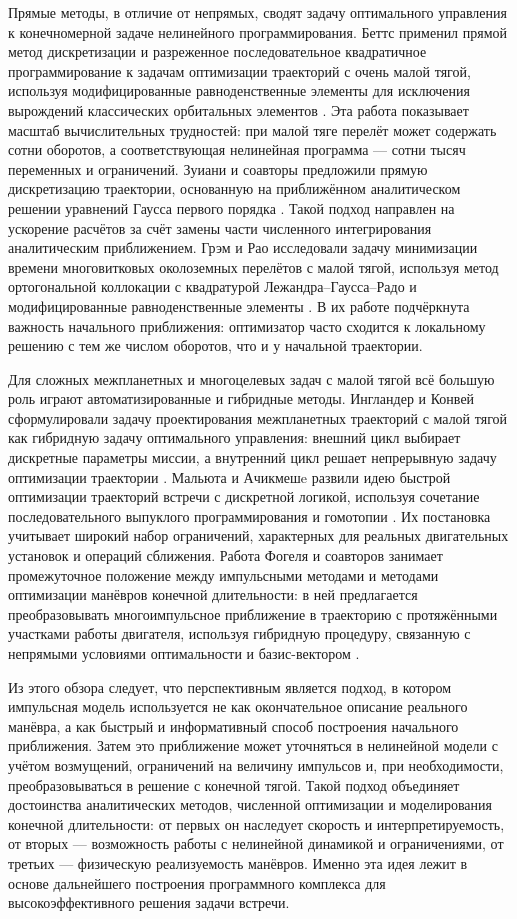 Прямые методы, в отличие от непрямых, сводят задачу оптимального управления к конечномерной задаче нелинейного программирования. Беттс применил прямой метод дискретизации и разреженное последовательное квадратичное программирование к задачам оптимизации траекторий с очень малой тягой, используя модифицированные равноденственные элементы для исключения вырождений классических орбитальных элементов \cite{betts2000very}. Эта работа показывает масштаб вычислительных трудностей: при малой тяге перелёт может содержать сотни оборотов, а соответствующая нелинейная программа — сотни тысяч переменных и ограничений. Зуиани и соавторы предложили прямую дискретизацию траектории, основанную на приближённом аналитическом решении уравнений Гаусса первого порядка \cite{zuiani2012direct}. Такой подход направлен на ускорение расчётов за счёт замены части численного интегрирования аналитическим приближением. Грэм и Рао исследовали задачу минимизации времени многовитковых околоземных перелётов с малой тягой, используя метод ортогональной коллокации с квадратурой Лежандра--Гаусса--Радо и модифицированные равноденственные элементы \cite{graham2015minimum}. В их работе подчёркнута важность начального приближения: оптимизатор часто сходится к локальному решению с тем же числом оборотов, что и у начальной траектории.

Для сложных межпланетных и многоцелевых задач с малой тягой всё большую роль играют автоматизированные и гибридные методы. Ингландер и Конвей сформулировали задачу проектирования межпланетных траекторий с малой тягой как гибридную задачу оптимального управления: внешний цикл выбирает дискретные параметры миссии, а внутренний цикл решает непрерывную задачу оптимизации траектории \cite{englander2017automated}. Мальюта и Ачикмешe развили идею быстрой оптимизации траекторий встречи с дискретной логикой, используя сочетание последовательного выпуклого программирования и гомотопии \cite{malyuta2023fast}. Их постановка учитывает широкий набор ограничений, характерных для реальных двигательных установок и операций сближения. Работа Фогеля и соавторов занимает промежуточное положение между импульсными методами и методами оптимизации манёвров конечной длительности: в ней предлагается преобразовывать многоимпульсное приближение в траекторию с протяжёнными участками работы двигателя, используя гибридную процедуру, связанную с непрямыми условиями оптимальности и базис-вектором \cite{fogel2020multi}.

Из этого обзора следует, что перспективным является подход, в котором импульсная модель используется не как окончательное описание реального манёвра, а как быстрый и информативный способ построения начального приближения. Затем это приближение может уточняться в нелинейной модели с учётом возмущений, ограничений на величину импульсов и, при необходимости, преобразовываться в решение с конечной тягой. Такой подход объединяет достоинства аналитических методов, численной оптимизации и моделирования конечной длительности: от первых он наследует скорость и интерпретируемость, от вторых --- возможность работы с нелинейной динамикой и ограничениями, от третьих --- физическую реализуемость манёвров. Именно эта идея лежит в основе дальнейшего построения программного комплекса для высокоэффективного решения задачи встречи.

